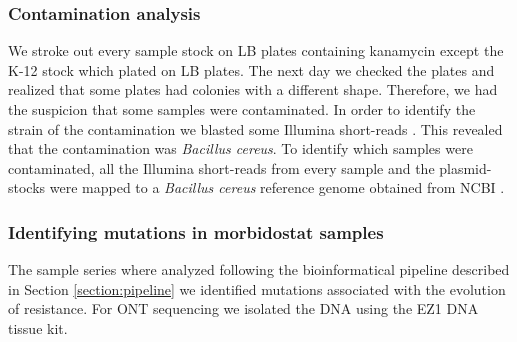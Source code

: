 \subsubsection{Contamination analysis}
We stroke out every sample stock on LB plates containing kanamycin except the K-12 stock which plated on LB plates. The next day we checked the plates and realized that some plates had colonies with a different shape. Therefore, we had the suspicion that some samples were contaminated. In order to identify the strain of the contamination we blasted some Illumina short-reads \cite{madden_blast_2003}. This revealed that the contamination was \textit{Bacillus cereus}. To identify which samples were contaminated, all the Illumina short-reads from every sample and the plasmid-stocks were mapped to a \textit{Bacillus cereus} reference genome obtained from NCBI \cite{noauthor_bacillus_nodate}.

\subsubsection{Identifying mutations in morbidostat samples}
The sample series where analyzed following the bioinformatical pipeline described in Section \ref{section:pipeline} we identified mutations associated with the evolution of resistance. For ONT sequencing we isolated the DNA using the EZ1 DNA tissue kit. 